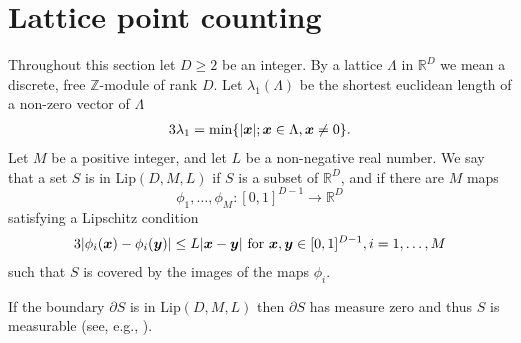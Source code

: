 \documentclass[11pt]{amsart}
\numberwithin{equation}{eqncounter}
\def\IR{\mathbb R}
\def\IZ{\mathbb Z}
\def\La{\Lambda}
\renewcommand{\vec}[1]{\mbox{\boldmath$#1$}}
\def\bx{\vec{x}}
\def\vx{{\vec{x}}}
\def\vy{{\vec{y}}}
\begin{document}
\section{Lattice point counting}\label{sec: lattcount}
Throughout this section let $D\geq 2$ be an integer.
By a lattice $\La$ in $\IR^D$ we mean a discrete, free $\IZ$-module of rank $D$.
Let $\lambda_1(\Lambda)$ be the shortest euclidean length of a non-zero vector of $\Lambda$ 
\begin{alignat*}3
\lambda_1=\min \{|\bx|;  \bx\in \Lambda, \bx\neq 0\}.
\end{alignat*}
Let $M$ be a positive integer,
and let $L$ be a non-negative real number.
We say that a set $S$ is in Lip$(D,M,L)$ if 
$S$ is a subset of $\IR^D$, and 
if there are $M$ maps 
$$\phi_1,\ldots,\phi_M:[0,1]^{D-1}\longrightarrow \IR^D$$
satisfying a Lipschitz condition
\begin{alignat*}3
|\phi_i(\vx)-\phi_i(\vy)|\leq L|\vx-\vy| \text{ for } \vx,\vy \in [0,1]^{D-1}, i=1,\ldots,M 
\end{alignat*}
such that $S$ is covered by the images
of the maps $\phi_i$. 

If the boundary $\partial S$ is in Lip$(D,M,L)$ then $\partial S$ has measure zero and thus $S$ is measurable (see, e.g., \cite{Spain}).
\end{document}
